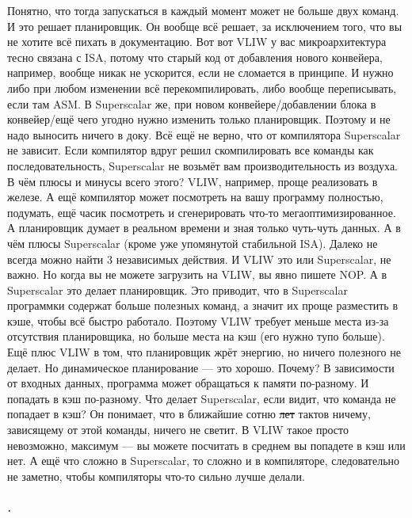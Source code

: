 \documentclass{article}
\begin{document}
    Понятно, что тогда запускаться в каждый момент может не больше двух команд. И это решает планировщик. Он вообще всё решает, за исключением того, что вы не хотите всё пихать в документацию. Вот вот VLIW у вас микроархитектура тесно связана с ISA, потому что старый код от добавления нового конвейера, например, вообще никак не ускорится, если не сломается в принципе. И нужно либо при любом изменении всё перекомпилировать, либо вообще переписывать, если там ASM. В Superscalar же, при новом конвейере/добавлении блока в конвейер/ещё чего угодно нужно изменить только планировщик. Поэтому и не надо выносить ничего в доку. Всё ещё не верно, что от компилятора Superscalar не зависит. Если компилятор вдруг решил скомпилировать все команды как последовательность, Superscalar не возьмёт вам производительность из воздуха.\\
    В чём плюсы и минусы всего этого? VLIW, например, проще реализовать в железе. А ещё компилятор может посмотреть на вашу программу полностью, подумать, ещё часик посмотреть и сгенерировать что-то мегаоптимизированное. А планировщик думает в реальном времени и зная только чуть-чуть данных. А в чём плюсы Superscalar (кроме уже упомянутой стабильной ISA). Далеко не всегда можно найти 3 независимых действия. И VLIW это или Superscalar, не важно. Но когда вы не можете загрузить на VLIW, вы явно пишете NOP. А в Superscalar это делает планировщик. Это приводит, что в Superscalar программки содержат больше полезных команд, а значит их проще разместить в кэше, чтобы всё быстро работало. Поэтому VLIW требует меньше места из-за отсутствия планировщика, но больше места на кэш (его нужно тупо больше). Ещё плюс VLIW в том, что планировщик жрёт энергию, но ничего полезного не делает. Но динамическое планирование --- это хорошо. Почему? В зависимости от входных данных, программа может обращаться к памяти по-разному. И попадать в кэш по-разному. Что делает Superscalar, если видит, что команда не попадает в кэш? Он понимает, что в ближайшие сотню \sout{лет} тактов ничему, зависящему от этой команды, ничего не светит. В VLIW такое просто невозможно, максимум --- вы можете посчитать в среднем вы попадете в кэш или нет. А ещё что сложно в Superscalar, то сложно и в компиляторе, следовательно не заметно, чтобы компиляторы что-то сильно лучше делали.
    \subparagraph{.}
\end{document}

